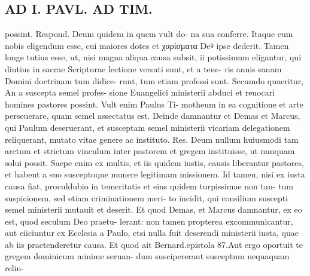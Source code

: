 \documentclass{article}
\begin{document}
\begin{pages}
\section*{AD I. PAVL. AD TIM. }
\marginpar{[ p.202 ]}possint. Respond. Deum quidem in quem vult do- na sua conferre. Itaque eum nobis eligendum esse, cui maiores dotes et χαρίσματα Deꝰ ipse dederit. Tamen longe tutius esse, ut, nisi magna aliqua causa subsit, ii potissimum eligantur, qui diutius in sacrae Scripturae lectione versati sunt, et a tene- ris annis sanam Domini doctrinam tum didice- runt, tum etiam professi sunt. Secumdo quaeritur, An a suscepta semel profes- sione Euangelici ministerii abduci et reuocari homines pastores possint. Vult enim Paulus Ti- motheum in ea cognitione et arte perseuerare, quam semel assectatus est. Deinde damnantur et Demas et Marcus, qui Paulum deseruerant, et susceptam semel ministerii vicariam delegationem reliquerant, mutato vitae genere ac instituto. Res. Deum nullum huiusmodi tam arctum et strictum vinculum inter pastorem et gregem instituisse, ut nunquam solui possit. Saepe enim ex multis, et iis quidem iustis, causis liberantur pastores, et habent a suo susceptoque munere legitimam missionem. Id tamen, nisi ex iusta causa fiat, proculdubio in temeritatis et eius quidem turpissimae non tan- tum suspicionem, sed etiam criminationem meri- to incidit, qui consilium suscepti semel ministerii mutauit et deserit. Et quod Demas, et Marcus damnantur, ex eo est, quod seculum Deo praetu- lerant: non tamen propterea excommunicantur, aut eiiciuntur ex Ecclesia a Paulo, etsi nulla fuit deserendi ministerii iusta, quae ab iis praetenderetur causa. Et quod ait Bernard.epistola 87.Aut ergo oportuit te gregem dominicum minime seruan- dum suscipereraut susceptum nequaquam relin- 

\end{pages}
\end{document}
